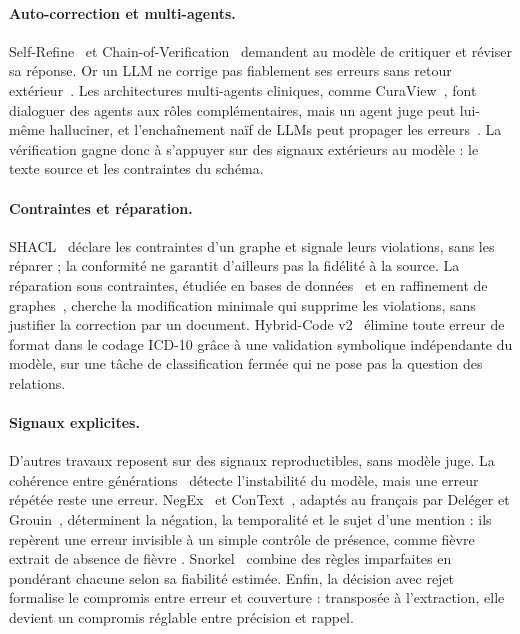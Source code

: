 \paragraph{Auto-correction et multi-agents.} Self-Refine~\cite{madaan2023selfrefine} et Chain-of-Verification~\cite{dhuliawala2024cove} demandent au modèle de critiquer et réviser sa réponse. Or un LLM ne corrige pas fiablement ses erreurs sans retour extérieur~\cite{huang2024cannot,kamoi2024selfcorrection}. Les architectures multi-agents cliniques, comme CuraView~\cite{ye2026curaview}, font dialoguer des agents aux rôles complémentaires, mais un agent juge peut lui-même halluciner, et l'enchaînement naïf de LLMs peut propager les erreurs~\cite{hong2024metagpt}. La vérification gagne donc à s'appuyer sur des signaux extérieurs au modèle : le texte source et les contraintes du schéma.

\paragraph{Contraintes et réparation.} SHACL~\cite{shacl2017} déclare les contraintes d'un graphe et signale leurs violations, sans les réparer ; la conformité ne garantit d'ailleurs pas la fidélité à la source. La réparation sous contraintes, étudiée en bases de données~\cite{chu2013holistic,rekatsinas2017holoclean} et en raffinement de graphes~\cite{paulheim2017refinement}, cherche la modification minimale qui supprime les violations, sans justifier la correction par un document. Hybrid-Code v2~\cite{hybrid2512v2} élimine toute erreur de format dans le codage ICD-10 grâce à une validation symbolique indépendante du modèle, sur une tâche de classification fermée qui ne pose pas la question des relations.

\paragraph{Signaux explicites.} D'autres travaux reposent sur des signaux reproductibles, sans modèle juge. La cohérence entre générations~\cite{wang2023selfconsistency,manakul2023selfcheckgpt} détecte l'instabilité du modèle, mais une erreur répétée reste une erreur. NegEx~\cite{chapman2001negex} et ConText~\cite{harkema2009context}, adaptés au français par Deléger et Grouin~\cite{deleger2012negation}, déterminent la négation, la temporalité et le sujet d'une mention : ils repèrent une erreur invisible à un simple contrôle de présence, comme \og fièvre \fg{} extrait de \og absence de fièvre \fg{}. Snorkel~\cite{ratner2017snorkel} combine des règles imparfaites en pondérant chacune selon sa fiabilité estimée. Enfin, la décision avec rejet~\cite{chow1970reject,geifman2017selective} formalise le compromis entre erreur et couverture : transposée à l'extraction, elle devient un compromis réglable entre précision et rappel.

